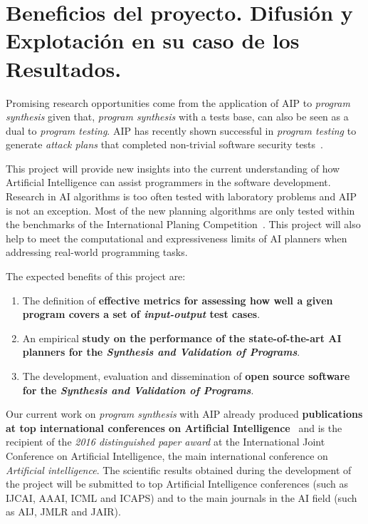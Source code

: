 \documentclass[10pt,a4paper]{paper}
\begin{document}
\newpage
\section{Beneficios del proyecto. Difusión y Explotación en su caso de los Resultados.}
\label{subsec:beneficios}
Promising research opportunities come from the application of AIP to {\em program synthesis} given that, {\em program synthesis} with a tests base, can also be seen as a dual to {\em program testing}. AIP has recently shown successful in {\em program testing} to generate {\em attack plans} that completed non-trivial software security tests~\cite{hoffmann2015simulated,steinmetz2016revisiting,shmaryahu2016constructing,steinmetz2016goal}.

This project will provide new insights into the current understanding of how Artificial Intelligence can assist programmers in the software development. Research in AI algorithms is too often tested with laboratory problems and AIP is not an exception. Most of the new planning algorithms are only tested within the benchmarks of the International Planing Competition~\cite{vallati:IPC:AI15}. This project will also help to meet the computational and expressiveness limits of AI planners when addressing real-world programming tasks. 

The expected benefits of this project are:
\begin{enumerate}
\item The definition of {\bf effective metrics for assessing how well a given program covers a set of {\em input-output} test cases}.
\item An empirical {\bf study on the performance of the state-of-the-art AI planners for the {\em Synthesis and Validation of Programs}}.
\item The development, evaluation and dissemination of {\bf open source software for the {\em Synthesis and Validation of Programs}}.
\end{enumerate}

Our current work on {\em program synthesis} with AIP already produced {\bf publications at top international conferences on Artificial Intelligence}~\cite{segovia2017generating,sergio:aprogramingb:ijcai16,sergio:aprograming:ijcai16,sergio:aprograming:icaps16} and is the recipient of the {\it 2016 distinguished paper award} at the International Joint Conference on Artificial Intelligence, the main international conference on {\em Artificial intelligence}. The scientific results obtained during the development of the project will be submitted to top Artificial Intelligence conferences (such as IJCAI, AAAI, ICML and ICAPS) and to the main journals in the AI field (such as AIJ, JMLR and JAIR).

\begin{tiny}

\end{tiny}

\end{document}
